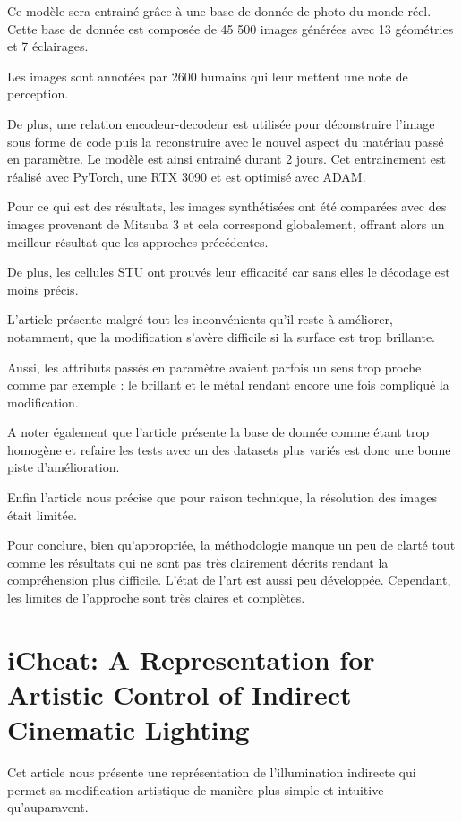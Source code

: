 \documentclass[runningheads]{llncs}
\begin{document}
Ce modèle sera entrainé grâce à une base de donnée de photo du monde réel. Cette base de donnée est composée de 45 500 images générées avec 13 géométries et 7 éclairages.

Les images sont annotées par 2600 humains qui leur mettent une note de perception.

De plus, une relation encodeur-decodeur est utilisée pour déconstruire l’image sous forme de code puis la reconstruire avec le nouvel aspect du matériau passé en paramètre. Le modèle est ainsi entrainé durant 2 jours. Cet entrainement est réalisé avec PyTorch, une RTX 3090 et est optimisé avec ADAM.

Pour ce qui est des résultats, les images synthétisées ont été comparées avec des images provenant de Mitsuba 3 et cela correspond globalement, offrant alors un meilleur résultat que les approches précédentes.

De plus, les cellules STU ont prouvés leur efficacité car sans elles le décodage est moins précis.

L’article présente malgré tout les inconvénients qu’il reste à améliorer, notamment, que la modification s’avère difficile si la surface est trop brillante.

Aussi, les attributs passés en paramètre avaient parfois un sens trop proche comme par exemple : le brillant et le métal rendant encore une fois compliqué la modification.

A noter également que l’article présente la base de donnée comme étant trop homogène et refaire les tests avec un des datasets plus variés est donc une bonne piste d’amélioration.

Enfin l’article nous précise que pour raison technique, la résolution des images était limitée.

Pour conclure, bien qu’appropriée, la méthodologie manque un peu de clarté tout comme les résultats qui ne sont pas très clairement décrits rendant la compréhension plus difficile. L’état de l’art est aussi peu développée. Cependant, les limites de l’approche sont très claires et complètes.

\section{iCheat: A Representation for Artistic Control of Indirect Cinematic Lighting}

Cet article nous présente une représentation de l'illumination indirecte qui permet sa modification artistique de manière plus simple et intuitive qu'auparavent.
\end{document}
